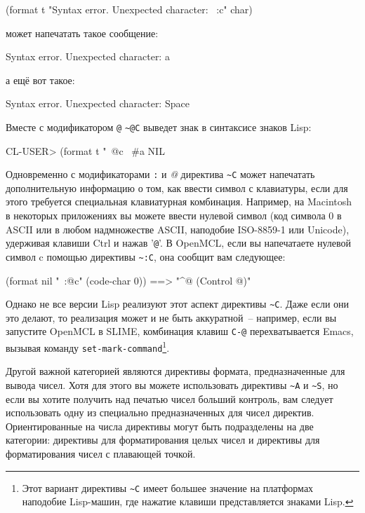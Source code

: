 \begin{myverb}
(format t "Syntax error. Unexpected character: ~:c" char)
\end{myverb}

\noindent{}может напечатать такое сообщение:

\begin{myverb}
  Syntax error. Unexpected character: a
\end{myverb}

\noindent{}а ещё вот такое:

\begin{myverb}
  Syntax error. Unexpected character: Space
\end{myverb}

Вместе с модификатором \lstinline!@! \lstinline!~@С! выведет знак в синтаксисе знаков
Lisp:

\begin{myverb}
CL-USER> (format t "~@c~%
#\bslash{}a
NIL
\end{myverb}

Одновременно с модификаторами \lstinline!:! и \textit{@} директива \lstinline!~C! может
напечатать дополнительную информацию о том, как ввести символ с клавиатуры, если для этого
требуется специальная клавиатурная комбинация. Например, на Macintosh в некоторых
приложениях вы можете ввести нулевой символ (код символа 0 в ASCII или в любом
надмножестве ASCII, наподобие ISO-8859-1 или Unicode), удерживая клавиши Ctrl и нажав
'\lstinline!@!'. В OpenMCL, если вы напечатаете нулевой символ c помощью директивы
\lstinline!~:C!, она сообщит вам следующее:
  
\begin{myverb}
(format nil "~:@c" (code-char 0)) ==> "^@ (Control @)"
\end{myverb}

Однако не все версии Lisp реализуют этот аспект директивы \lstinline!~C!. Даже если они
это делают, то реализация может и не быть аккуратной~-- например, если вы запустите OpenMCL
в SLIME, комбинация клавиш \lstinline!C-@! перехватывается Emacs, вызывая команду
\lstinline{set-mark-command}\footnote{Этот вариант директивы \lstinline!~C! имеет большее
  значение на платформах наподобие Lisp-машин, где нажатие клавиши представляется знаками
  Lisp.}.
	
Другой важной категорией являются директивы формата, предназначенные для вывода
чисел. Хотя для этого вы можете использовать директивы \lstinline!~A! и \lstinline!~S!, но
если вы хотите получить над печатью чисел больший контроль, вам следует использовать одну
из специально предназначенных для чисел директив. Ориентированные на числа директивы могут
быть подразделены на две категории: директивы для форматирования целых чисел и директивы
для форматирования чисел с плавающей точкой.


